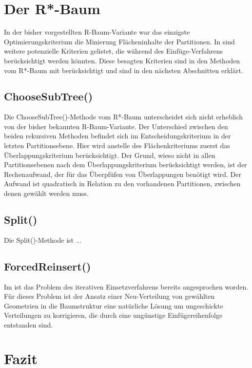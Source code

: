\documentclass[runningheads,a4paper]{llncs}
\begin{document}


\section{Der R*-Baum} %
\label{sec:rstar_tree}
In der bisher vorgestellten R-Baum-Variante war das einzigste Optimierungskriterium die Minierung Flächeninhalte der Partitionen. In  sind weitere potenzielle Kriterien gelistet, die während des Einfüge-Verfahrens berücksichtigt werden könnten. Diese besagten Kriterien sind in den Methoden vom R*-Baum mit berücksichtigt und sind in den nächsten Abschnitten erklärt.

\subsection{ChooseSubTree()}
Die ChooseSubTree()-Methode vom R*-Baum unterscheidet sich nicht erheblich von der bisher bekannten R-Baum-Variante. Der Unterschied zwischen den beiden rekursiven Methoden befindet sich im Entscheidungskriterium in der letzten Partitionsebene. Hier wird anstelle des Flächenkriteriums zuerst das Überlappungskriterium berücksichtigt. Der Grund, wieso nicht in allen Partitionsebenen nach dem Überlappungskriterium berücksichtigt werden, ist der Rechenaufwand, der für das Überpfüfen von Überlappungen benötigt wird. Der Aufwand ist quadratisch in Relation zu den vorhandenen Partitionen, zwischen denen gewählt werden muss. 

\subsection{Split()}
Die Split()-Methode ist ...

\subsection{ForcedReinsert()}
\label{sec:rstar_reinsert}
Im  ist das Problem des iterativen Einsetzverfahrens bereits angesprochen worden. Für dieses Problem ist der Ansatz einer Neu-Verteilung von gewählten Geometrien in die Baumstruktur eine natürliche Lösung um ungeschickte Verteilungen zu korrigieren, die durch eine ungünstige Einfügereihenfolge entstanden sind. 


\section{Fazit} %
\label{sec:fazit}
\end{document}
